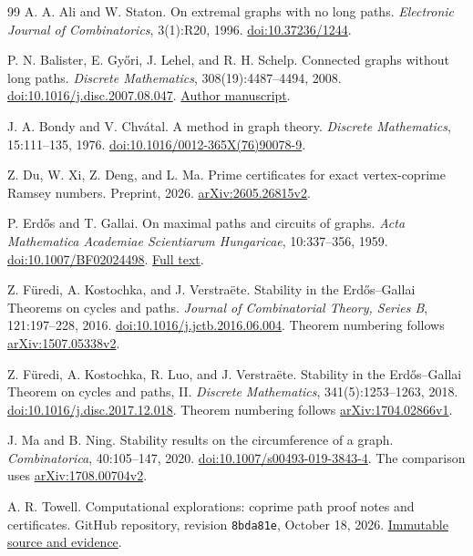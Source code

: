 \documentclass[12pt]{article}
\newcommand{\repo}{https://github.com/queelius/computational-explorations}
\newcommand{\revision}{8bda81e8d3f867bb1450b0e492592164416ba98f}
\begin{document}
\begin{thebibliography}{99}
A. A. Ali and W. Staton.
On extremal graphs with no long paths.
\emph{Electronic Journal of Combinatorics}, 3(1):R20, 1996.
\href{https://doi.org/10.37236/1244}{doi:10.37236/1244}.

P. N. Balister, E. Gy\H{o}ri, J. Lehel, and R. H. Schelp.
Connected graphs without long paths.
\emph{Discrete Mathematics}, 308(19):4487--4494, 2008.
\href{https://doi.org/10.1016/j.disc.2007.08.047}{doi:10.1016/j.disc.2007.08.047}.
\href{https://www.memphis.edu/msci/people/pbalistr/nopk.pdf}{Author manuscript}.

J. A. Bondy and V. Chv\'atal.
A method in graph theory.
\emph{Discrete Mathematics}, 15:111--135, 1976.
\href{https://doi.org/10.1016/0012-365X(76)90078-9}{doi:10.1016/0012-365X(76)90078-9}.

Z. Du, W. Xi, Z. Deng, and L. Ma.
Prime certificates for exact vertex-coprime Ramsey numbers.
Preprint, 2026.
\href{https://arxiv.org/abs/2605.26815v2}{arXiv:2605.26815v2}.

P. Erd\H{o}s and T. Gallai.
On maximal paths and circuits of graphs.
\emph{Acta Mathematica Academiae Scientiarum Hungaricae},
10:337--356, 1959.
\href{https://doi.org/10.1007/BF02024498}{doi:10.1007/BF02024498}.
\href{https://web.vu.lt/mif/s.jukna/tropical/Erdos-Gallai-1959.pdf}{Full text}.

Z. F\"uredi, A. Kostochka, and J. Verstra\"ete.
Stability in the Erd\H{o}s--Gallai Theorems on cycles and paths.
\emph{Journal of Combinatorial Theory, Series B}, 121:197--228, 2016.
\href{https://doi.org/10.1016/j.jctb.2016.06.004}{doi:10.1016/j.jctb.2016.06.004}.
Theorem numbering follows
\href{https://arxiv.org/abs/1507.05338v2}{arXiv:1507.05338v2}.

Z. F\"uredi, A. Kostochka, R. Luo, and J. Verstra\"ete.
Stability in the Erd\H{o}s--Gallai Theorem on cycles and paths, II.
\emph{Discrete Mathematics}, 341(5):1253--1263, 2018.
\href{https://doi.org/10.1016/j.disc.2017.12.018}{doi:10.1016/j.disc.2017.12.018}.
Theorem numbering follows
\href{https://arxiv.org/abs/1704.02866v1}{arXiv:1704.02866v1}.

J. Ma and B. Ning.
Stability results on the circumference of a graph.
\emph{Combinatorica}, 40:105--147, 2020.
\href{https://doi.org/10.1007/s00493-019-3843-4}{doi:10.1007/s00493-019-3843-4}.
The comparison uses
\href{https://arxiv.org/abs/1708.00704v2}{arXiv:1708.00704v2}.

A. R. Towell.
Computational explorations: coprime path proof notes and certificates.
GitHub repository, revision \texttt{8bda81e}, October 18, 2026.
\href{\repo/tree/\revision}{Immutable source and evidence}.
\end{thebibliography}
\end{document}
